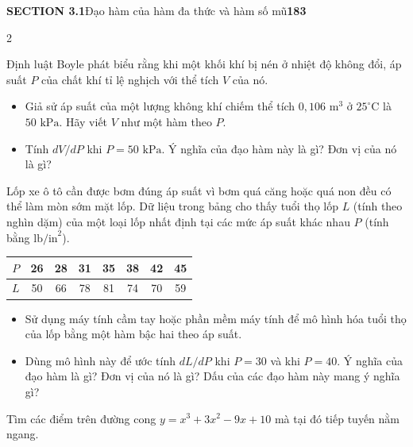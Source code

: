\noindent\textbf{\textsf{SECTION 3.1}}\quad \textsf{Đạo hàm của hàm đa thức và hàm số mũ}\hfill \textbf{\textsf{183}}
\vspace{8pt}

\begin{multicols}{2}

 Định luật Boyle phát biểu rằng khi một khối khí bị nén ở nhiệt độ không đổi, áp suất $P$ của chất khí tỉ lệ nghịch với thể tích $V$ của nó.
\begin{itemize}[leftmargin=1.5em, itemsep=2pt, topsep=2pt, parsep=0pt, label={\alph*)}]
  \item[(a)] Giả sử áp suất của một lượng không khí chiếm thể tích $0{,}106\text{ m}^3$ ở $25^\circ\text{C}$ là $50\text{ kPa}$. Hãy viết $V$ như một hàm theo $P$.
  \item[(b)] Tính $dV/dP$ khi $P = 50\text{ kPa}$. Ý nghĩa của đạo hàm này là gì? Đơn vị của nó là gì?
\end{itemize}

\llap{\iconT\hspace{3pt}} Lốp xe ô tô cần được bơm đúng áp suất vì bơm quá căng hoặc quá non đều có thể làm mòn sớm mặt lốp. Dữ liệu trong bảng cho thấy tuổi thọ lốp $L$ (tính theo nghìn dặm) của một loại lốp nhất định tại các mức áp suất khác nhau $P$ (tính bằng $\text{lb/in}^2$).

\begin{center}
\small
\renewcommand{\arraystretch}{1.2}
\begin{tabular}{|*{8}{c|}}
\hline
$P$ & 26 & 28 & 31 & 35 & 38 & 42 & 45 \\ \hline
$L$ & 50 & 66 & 78 & 81 & 74 & 70 & 59 \\ \hline
\end{tabular}
\end{center}

\begin{itemize}[leftmargin=1.5em, itemsep=2pt, topsep=2pt, parsep=0pt]
  \item[(a)] Sử dụng máy tính cầm tay hoặc phần mềm máy tính để mô hình hóa tuổi thọ của lốp bằng một hàm bậc hai theo áp suất.
  \item[(b)] Dùng mô hình này để ước tính $dL/dP$ khi $P = 30$ và khi $P = 40$. Ý nghĩa của đạo hàm là gì? Đơn vị của nó là gì? Dấu của các đạo hàm này mang ý nghĩa gì?
\end{itemize}

 Tìm các điểm trên đường cong $y = x^3 + 3x^2 - 9x + 10$ mà tại đó tiếp tuyến nằm ngang.


\end{multicols}
